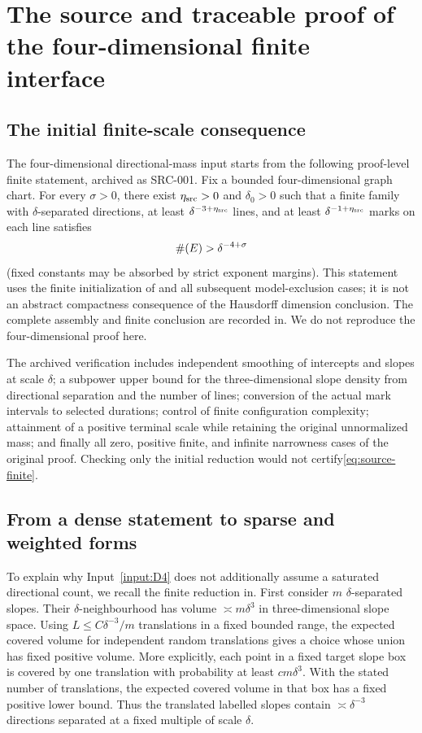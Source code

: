 \section{The source and traceable proof of the four-dimensional finite interface}\label{app:inputs}

\subsection{The initial finite-scale consequence}
The four-dimensional directional-mass input starts from the following proof-level finite statement, archived as SRC-001.
Fix a bounded four-dimensional graph chart. For every $\sigma>0$, there exist $\eta_{\rm src}>0$ and $\delta_0>0$
such that a finite family with $\delta$-separated directions, at least $\delta^{-3+\eta_{\rm src}}$ lines,
and at least $\delta^{-1+\eta_{\rm src}}$ marks on each line satisfies
\begin{equation}\label{eq:source-finite}
 \#\!\left(E\right)>\delta^{-4+\sigma}
\end{equation}
(fixed constants may be absorbed by strict exponent margins).
This statement uses the finite initialization of\cite{OAI4} and all subsequent model-exclusion cases;
it is not an abstract compactness consequence of the Hausdorff dimension conclusion.
The complete assembly and finite conclusion are recorded in\cite{ArchiveSource}.
We do not reproduce the four-dimensional proof here.

The archived verification includes independent smoothing of intercepts and slopes at scale $\delta$;
a subpower upper bound for the three-dimensional slope density from directional separation and the number of lines;
conversion of the actual mark intervals to selected durations; control of finite configuration complexity;
attainment of a positive terminal scale while retaining the original unnormalized mass;
and finally all zero, positive finite, and infinite narrowness cases of the original proof.
Checking only the initial reduction would not certify\eqref{eq:source-finite}.

\subsection{From a dense statement to sparse and weighted forms}
To explain why Input~\ref{input:D4} does not additionally assume a saturated directional count,
we recall the finite reduction in\cite{ArchiveDIR}.
First consider $m$ $\delta$-separated slopes. Their $\delta$-neighbourhood has volume $\asymp m\delta^3$
in three-dimensional slope space.
Using $L\le C\delta^{-3}/m$ translations in a fixed bounded range,
the expected covered volume for independent random translations gives a choice whose union has fixed positive volume.
More explicitly, each point in a fixed target slope box is covered by one translation with probability at least $c m\delta^3$.
With the stated number of translations, the expected covered volume in that box has a fixed positive lower bound.
Thus the translated labelled slopes contain $\asymp\delta^{-3}$ directions separated at a fixed multiple of scale $\delta$.

